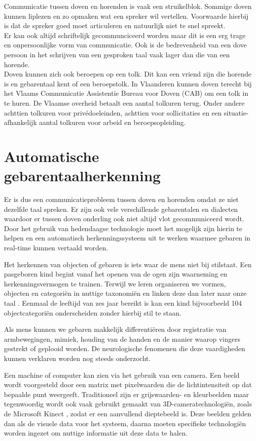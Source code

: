 \npar Communicatie tussen doven en horenden is vaak een struikelblok. Sommige doven kunnen liplezen en zo opmaken wat een spreker wil vertellen. Voorwaarde hierbij is dat de spreker goed moet articuleren en natuurlijk niet te snel spreekt.
\\ Er kan ook altijd schriftelijk gecommunciceerd worden maar dit is een erg trage en onpersoonlijke vorm van communicatie. Ook is de bedrevenheid van een dove persoon in het schrijven van een gesproken taal vaak lager dan die van een horende.
\\ Doven kunnen zich ook beroepen op een tolk. Dit kan een vriend zijn die horende is en gebarentaal kent of een beroepstolk. In Vlaanderen kunnen doven terecht bij het Vlaams Communicatie Assistentie Bureau voor Doven (CAB) om een tolk in te huren. De Vlaamse overheid betaalt een aantal tolkuren terug. Onder andere achttien tolkuren voor priv\'edoeleinden, achttien voor sollicitaties en een situatie-afhankelijk aantal tolkuren voor arbeid en beroepsopleiding.
 
\section{Automatische gebarentaalherkenning}
Er is dus een communicatieprobleem tussen doven en horenden omdat ze niet dezelfde taal spreken. Er zijn ook vele verschillende gebarentalen en dialecten waardoor er tussen doven onderling ook niet altijd vlot gecommuniceerd wordt.
Door het gebruik van hedendaagse technologie moet het mogelijk zijn hierin te helpen en een automatisch herkenningssysteem uit te werken waarmee gebaren in real-time kunnen vertaald worden.

\npar Het herkennen van objecten of gebaren is iets waar de mens niet bij stilstaat. Een pasgeboren kind begint vanaf het openen van de ogen zijn waarneming en herkenningsvermogen te trainen. Terwijl we leren organiseren we vormen, objecten en categori\"en in nuttige taxonomi\"en en linken deze dan later naar onze taal \cite{oneshot-object-cat}. Eenmaal de leeftijd van zes jaar bereikt is kan een kind bijvoorbeeld 104 objectcategori\"en onderscheiden zonder hierbij stil te staan.

\npar Als mens kunnen we gebaren makkelijk differenti\"eren door registratie van armbewegingen, mimiek, houding van de handen en de manier waarop vingers gestrekt of geplooid worden. De neurologische fenomenen die deze vaardigheden kunnen verklaren worden nog steeds onderzocht. 

\npar Een machine of computer kan zien via het gebruik van een camera. Een beeld wordt voorgesteld door een matrix met pixelwaarden die de lichtintensiteit op dat bepaalde punt weergeeft. Traditioneel zijn er grijswaarden- en kleurbeelden maar tegenwoordig wordt ook vaak gebruikt gemaakt van 3D-cameratechnologi\"en, zoals de Microsoft Kinect \cite{kuhn2011kinect}, zodat er een aanvullend dieptebeeld is. Deze beelden gelden dan als de visuele data voor het systeem, daarna moeten specifieke technologi\"en worden ingezet om nuttige informatie uit deze data te halen.

